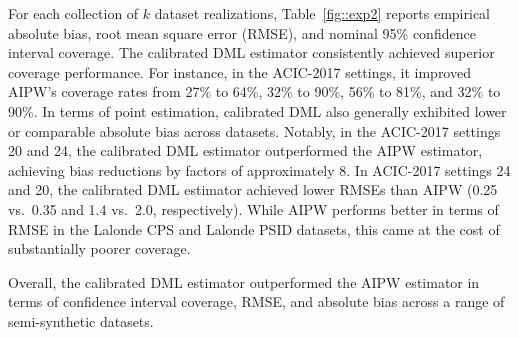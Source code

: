 \documentclass[11pt]{article}
\theoremstyle{plain}
\begin{document}
 
 

 For each collection of $k$ dataset realizations, Table~\ref{fig::exp2} reports empirical absolute bias, root mean square error (RMSE), and nominal 95\% confidence interval coverage. The calibrated DML estimator consistently achieved superior coverage performance.  For instance, in the ACIC-2017 settings, it improved AIPW's coverage rates from 27\% to 64\%, 32\% to 90\%, 56\% to 81\%, and 32\% to 90\%.  In terms of point estimation, calibrated DML also generally exhibited lower or comparable absolute bias across datasets. Notably, in the ACIC-2017 settings 20 and 24, the calibrated DML estimator outperformed the AIPW estimator, achieving bias reductions by factors of approximately 8. In ACIC-2017 settings 24 and 20, the calibrated DML estimator achieved lower RMSEs than AIPW (0.25 vs.\ 0.35 and 1.4 vs.\ 2.0, respectively). While AIPW performs better in terms of RMSE in the Lalonde CPS and Lalonde PSID datasets, this came at the cost of substantially poorer coverage.




 



Overall, the calibrated DML estimator outperformed the AIPW estimator in terms of confidence interval coverage, RMSE, and absolute bias across a range of semi-synthetic datasets.%
\end{document}
